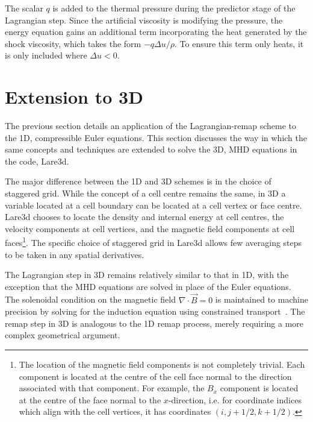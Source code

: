 The scalar $q$ is added to the thermal pressure during the predictor stage of the Lagrangian step. Since the artificial viscosity is modifying the pressure, the energy equation gains an additional term incorporating the heat generated by the shock viscosity, which takes the form $-q\Delta u/\rho$. To ensure this term only heats, it is only included where $\Delta u < 0$. 

\section{Extension to 3D}

The previous section details an application of the Lagrangian-remap scheme to the 1D, compressible Euler equations. This section discusses the way in which the same concepts and techniques are extended to solve the 3D, MHD equations in the code, Lare3d.

The major difference between the 1D and 3D schemes is in the choice of staggered grid. While the concept of a cell centre remains the same, in 3D a variable located at a cell boundary can be located at a cell vertex or face centre. Lare3d chooses to locate the density and internal energy at cell centres, the velocity components at cell vertices, and the magnetic field components at cell faces\footnote{The location of the magnetic field components is not completely trivial. Each component is located at the centre of the cell face normal to the direction associated with that component. For example, the $B_x$ component is located at the centre of the face normal to the $x$-direction, i.e. for coordinate indices which align with the cell vertices, it has coordinates $(i, j+1/2, k+1/2)$.}. The specific choice of staggered grid in Lare3d allows few averaging steps to be taken in any spatial derivatives.

The Lagrangian step in 3D remains relatively similar to that in 1D, with the exception that the MHD equations are solved in place of the Euler equations. The solenoidal condition on the magnetic field $\nabla \cdot \vec{B} =0$ is maintained to machine precision by solving for the induction equation using constrained transport~\cite{evansSimulationMagnetohydrodynamicFlows1988a}. The remap step in 3D is analogous to the 1D remap process, merely requiring a more complex geometrical argument. 

